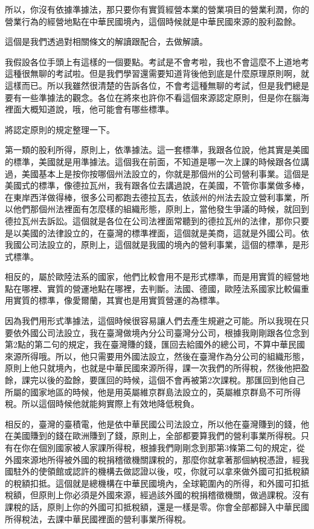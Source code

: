 \documentclass[]{ctexbook}
\begin{document}
所以，你沒有依據準據法，那只要你有實質經營本業的營業項目的營業利潤，你的營業行為的經營地點在中華民國境內，這個時候就是中華民國來源的股利盈餘。

這個是我們透過對相關條文的解讀跟配合，去做解讀。

我假設各位手頭上有這樣的一個要點。考試是不會考啦，我也不會這麼不上道地考這種很無聊的考試啦。但是我們學習還需要知道背後他到底是什麼原理原則啊，就這樣而已。所以我雖然很清楚的告訴各位，不會考這種無聊的考試，但是我們總是要有一些準據法的觀念。各位在將來也許你不看這個來源認定原則，但是你在腦海裡面大概知道說，哦，他可能會有哪些標準。

將認定原則的規定整理一下。

第一類的股利所得，原則上，依準據法。這一套標準，我跟各位說，他其實是美國的標準，美國就是用準據法。這個我在前面，不知道是哪一次上課的時候跟各位講過，美國基本上是按你按哪個州法設立的，你就是那個州的公司營利事業。這個是美國式的標準，像德拉瓦州，我有跟各位去講過說，在美國，不管你事業做多棒，在東岸西洋做得棒，很多公司都跑去德拉瓦去，依該州的州法去設立營利事業，所以他們那個州法裡面有怎麼樣的組織形態，原則上，當他發生爭議的時候，就回到德拉瓦州去訴訟。這個就是各位在公司法裡面常聽到的德拉瓦州的法律，那你只要是以美國的法律設立的，在臺灣的標準裡面，這個就是美商，這就是外國公司。依我國公司法設立的，原則上，這個就是我國的境內的營利事業，這個的標準，是形式標準。

相反的，屬於歐陸法系的國家，他們比較會用不是形式標準，而是用實質的經營地點在哪裡、實質的營運地點在哪裡，去判斷。法國、德國，歐陸法系國家比較偏重用實質的標準，像愛爾蘭，其實也是用實質營運的為標準。

因為我們用形式準據法，這個時候很容易讓人們去產生規避之可能。所以我現在只要依外國公司法設立，我在臺灣做境內分公司臺灣分公司，根據我剛剛跟各位念到第2點的第二句的規定，我在臺灣賺的錢，匯回去給國外的總公司，不算中華民國來源所得哦。所以，他只需要用外國法設立，然後在臺灣作為分公司的組織形態，原則上他只就境內，也就是中華民國來源所得，課一次我們的所得稅，然後他把盈餘，課完以後的盈餘，要匯回的時候，這個不會再被第2次課稅。那匯回到他自己所屬的國家地區的時候，他是用英屬維京群島法設立的，英屬維京群島不可所得稅。所以這個時候他就能夠實際上有效地降低稅負。

相反的，臺灣的臺積電，他是依中華民國公司法設立，所以他在臺灣賺到的錢，他在美國賺到的錢在歐洲賺到了錢，原則上，全部都要算我們的營利事業所得稅。只有在你在個別國家被人家課所得稅，根據我們剛剛念到那第3條第二句的規定，從外國來源地所得被外國的稅捐稽徵機關課稅的，那麼你就拿著那個納稅憑證，經我國駐外的使領館或認許的機構去做認證以後，哎，你就可以拿來做外國可扣抵稅額的稅額扣抵。這個就是總機構在中華民國境內，全球範圍內的所得，和外國可扣抵稅額，但原則上你必須是外國來源，經過該外國的稅捐稽徵機關，做過課稅。沒有課稅的話，原則上你的外國可扣抵稅額，還是一樣是零。你會全部都歸入中華民國所得稅法，去課中華民國裡面的營利事業所得稅。
\end{document}
